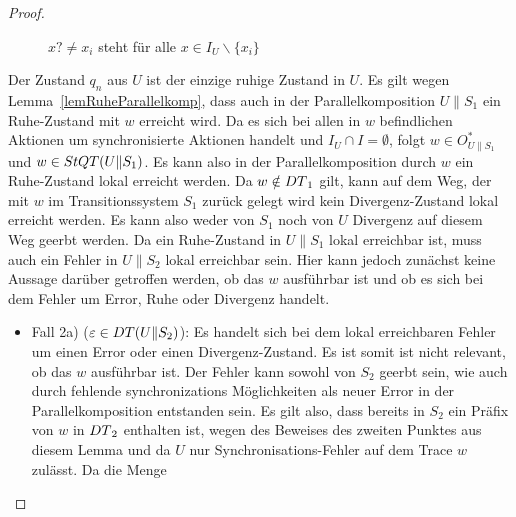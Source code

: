 \begin{proof}
\begin{itemize}
\begin{figure} [h!tbp]
\begin{center}
        \caption{$x?\neq x_i$ steht für alle $x\in I_U\backslash\{x_i\}$}
\label{UohneEmitIundO}
      \end{center}
      \end{figure}
      Der Zustand $q_n$ aus $U$ ist der einzige ruhige Zustand in $U$.
      Es gilt wegen Lemma~\ref{lemRuheParallelkomp}, dass auch in der
      Parallelkomposition $U\|S_1$ ein Ruhe-Zustand mit $w$ erreicht wird. Da
      es sich bei allen in $w$ befindlichen Aktionen um synchronisierte
      Aktionen handelt und $I_U\cap I=\emptyset$, folgt $w\in O_{U\|S_1}^*$ und
      $w\in StQT{}(U\|S_1)$. Es kann also in der Parallelkomposition durch $w$
      ein Ruhe-Zustand lokal erreicht werden. Da $w\notin DT{}_1$ gilt, kann
      auf dem Weg, der mit $w$ im Transitionssystem $S_1$ zurück gelegt wird
      kein Divergenz-Zustand lokal erreicht werden. Es kann also weder von
      $S_1$ noch von $U$ Divergenz auf diesem Weg geerbt werden. Da ein
      Ruhe-Zustand in $U\|S_1$ lokal erreichbar ist, muss auch ein Fehler in
      $U\|S_2$ lokal erreichbar sein. Hier kann jedoch zunächst keine Aussage
      darüber getroffen werden, ob das $w$ ausführbar ist und ob es sich bei
      dem Fehler um Error, Ruhe oder Divergenz handelt.
      \begin{itemize}
        \item Fall 2a) ($\varepsilon\in DT{}(U\|S_2)$): Es handelt sich bei
          dem lokal erreichbaren Fehler um einen Error oder einen
          Divergenz-Zustand. Es ist somit ist nicht relevant, ob das $w$
          ausführbar ist. Der Fehler kann sowohl von $S_2$ geerbt sein, wie
          auch durch fehlende synchronizations Möglichkeiten als neuer Error in
          der Parallelkomposition entstanden sein. Es gilt also, dass bereits
          in $S_2$ ein Präfix von $w$ in $DT{}_2$ enthalten ist, wegen des
          Beweises des zweiten Punktes aus diesem Lemma und da $U$ nur
          Synchronisations-Fehler auf dem Trace $w$ zulässt. Da die Menge \DT{}

\end{itemize}
\end{itemize}
\end{proof}
